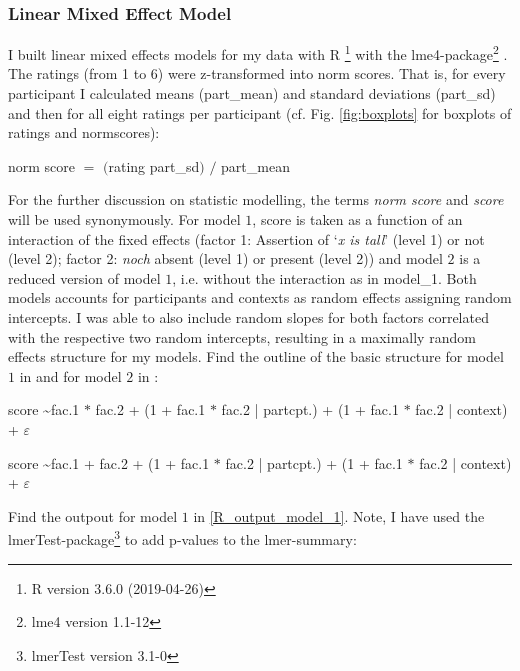 \documentclass[output=paper,
modfonts
]{langscibook}
\begin{document}
\subsubsection{Linear Mixed Effect Model}

I built linear mixed effects models for my data with R \citep{r_software}\footnote{R version 3.6.0 (2019-04-26)} with the lme4-package\footnote{ lme4 version 1.1-12} \citep{lme4}. The ratings (from 1 to 6) were z-transformed into norm scores. That is, for every participant I calculated means (part\_mean) and standard deviations (part\_sd) and then for all eight ratings per participant (cf. Fig. \ref{fig:boxplots} for boxplots of ratings and normscores):

\ea norm score $=$ $($rating \textminus part\_sd$)$ $/$ part\_mean\z

For the further discussion on statistic modelling, the terms \textit{norm score} and \textit{score} will be used synonymously. For model $1$, score is taken as a function of an interaction of the fixed effects (factor 1: Assertion of `\textit{x is tall}' (level 1) or not (level 2); factor 2: \textit{noch} absent (level 1) or present (level 2)) and model $2$ is a reduced version of model $1$, i.e. without the interaction as in model\_1. Both models accounts for participants and contexts as random effects assigning random intercepts. I was able to also include random slopes for both factors correlated with the respective two random intercepts, resulting in a maximally random effects structure for my models. Find the outline of the basic structure for model $1$ in  and for model $2$ in :

\ea score \textasciitilde fac.1 $*$ fac.2 + (1 + fac.1 $*$ fac.2 | partcpt.) + (1 + fac.1 $*$ fac.2 | context) + $\varepsilon$ \label{LME_model_1}     \z

\ea score \textasciitilde fac.1 + fac.2 + (1 + fac.1 $*$ fac.2 | partcpt.) + (1 + fac.1 $*$ fac.2 | context) + $\varepsilon$ \label{LME_model_2}        \z

Find the outpout for model $1$ in \ref{R_output_model_1}. Note, I have used the lmerTest-package\footnote{lmerTest version 3.1-0} \citep{lmerTest} to add p-values to the lmer-summary:
\end{document}
